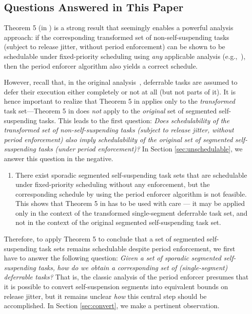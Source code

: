 \subsection{Questions Answered in This Paper}
\label{sec:questions}

Theorem 5 (in \cite{Raj:suspension1991}) is a strong result that seemingly enables a powerful analysis approach: if the corresponding transformed set of non-self-suspending tasks (subject to release jitter, without period enforcement) can be shown to be schedulable under fixed-priority scheduling using \emph{any} applicable analysis (e.g.,~\cite{ABRTW:93}), then the period enforcer algorithm also yields a correct schedule.

However, recall that, in the original analysis~\cite{Raj:suspension1991}, deferrable tasks are assumed to defer their  execution either completely or not at all (but not parts of it). It is hence important to realize that Theorem 5 in \cite{Raj:suspension1991} applies only to the \emph{transformed} task set---Theorem 5 in \cite{Raj:suspension1991} does \emph{not} apply to the \emph{original} set of segmented self-suspending tasks. This leads to the first question: \emph{Does schedulability of the transformed set of non-self-suspending tasks (subject to release jitter, without period enforcement) also imply schedulability of the original set of segmented self-suspending tasks (under period enforcement)?} In Section \ref{sec:unschedulable}, we answer this question in the negative.

\begin{enumerate}
	\item There exist sporadic segmented self-suspending task sets that are schedulable under fixed-priority scheduling without any enforcement, but the corresponding schedule by using the period enforcer algorithm is not feasible. This shows that Theorem 5 in \cite{Raj:suspension1991} has to be  used with care --- it may be applied only in the context of the transformed single-segment deferrable task set, and not in the context of the original segmented self-suspending task set.
\end{enumerate}


Therefore, to apply Theorem 5 to conclude that a set of segmented self-suspending task sets remains schedulable despite period enforcement, we first have to answer the following question: \emph{Given a set of sporadic segmented self-suspending tasks, how do we obtain a corresponding set of (single-segment) deferrable tasks?} That is, the classic analysis of the period enforcer \cite{Raj:suspension1991} presumes that it is possible to convert self-suspension segments into equivalent bounds on release jitter, but it remains unclear \emph{how} this central step should be accomplished. In Section \ref{sec:convert}, we make a pertinent observation.

